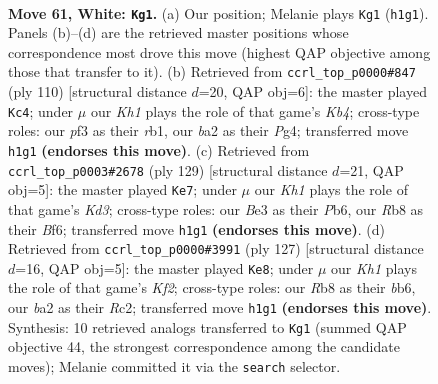\documentclass[11pt]{article}
\begin{document}
\clearpage

\begin{figure}[p]\centering
\begin{subfigure}{0.46\textwidth}\centering
\resizebox{\linewidth}{!}{%
\newchessgame
\chessboard[
  setfen={1R6/6k1/4r3/8/B3p2p/4Bp1P/b4P2/7K w - - 32 61},
  showmover=false,
  pgfstyle=straightmove, color=movearrow, markmove={h1-g1}
]}
\caption{}
\end{subfigure}\hfill
\begin{subfigure}{0.46\textwidth}\centering
\resizebox{\linewidth}{!}{%
\newchessgame
\chessboard[
  setfen={5k2/R2B1p2/3p4/4b1pP/1K2P1P1/8/8/1r6 w - - 27 56},
  showmover=false,
  pgfstyle=straightmove, color=movearrow, markmove={b4-c4}
]}
\caption{}
\end{subfigure}
\\[4pt]
\begin{subfigure}{0.46\textwidth}\centering
\resizebox{\linewidth}{!}{%
\newchessgame
\chessboard[
  setfen={8/p7/1p1k1b2/1P3P2/P4K1p/1B5P/8/8 b - - 5 65},
  showmover=false,
  pgfstyle=straightmove, color=movearrow, markmove={d6-e7}
]}
\caption{}
\end{subfigure}\hfill
\begin{subfigure}{0.46\textwidth}\centering
\resizebox{\linewidth}{!}{%
\newchessgame
\chessboard[
  setfen={8/3R1k2/1B6/4Pp2/5Pp1/5bP1/2r5/4K3 b - - 13 64},
  showmover=false,
  pgfstyle=straightmove, color=movearrow, markmove={f7-e8}
]}
\caption{}
\end{subfigure}
\caption{\textbf{Move 61, White: \texttt{Kg1}.} (a) Our position; Melanie plays \texttt{Kg1} (\texttt{h1g1}). Panels (b)--(d) are the retrieved master positions whose correspondence most drove this move (highest QAP objective among those that transfer to it). (b) Retrieved from \texttt{ccrl\_top\_p0000\#847} (ply 110) [structural distance $d$=20, QAP obj=6]: the master played \texttt{Kc4}; under $\mu$ our \emph{Kh1} plays the role of that game's \emph{Kb4}; cross-type roles: our \emph{p}f3 as their \emph{r}b1, our \emph{b}a2 as their \emph{P}g4; transferred move \texttt{h1g1} \textbf{(endorses this move)}. (c) Retrieved from \texttt{ccrl\_top\_p0003\#2678} (ply 129) [structural distance $d$=21, QAP obj=5]: the master played \texttt{Ke7}; under $\mu$ our \emph{Kh1} plays the role of that game's \emph{Kd3}; cross-type roles: our \emph{B}e3 as their \emph{P}b6, our \emph{R}b8 as their \emph{B}f6; transferred move \texttt{h1g1} \textbf{(endorses this move)}. (d) Retrieved from \texttt{ccrl\_top\_p0000\#3991} (ply 127) [structural distance $d$=16, QAP obj=5]: the master played \texttt{Ke8}; under $\mu$ our \emph{Kh1} plays the role of that game's \emph{Kf2}; cross-type roles: our \emph{R}b8 as their \emph{b}b6, our \emph{b}a2 as their \emph{R}c2; transferred move \texttt{h1g1} \textbf{(endorses this move)}. Synthesis: 10 retrieved analogs transferred to \texttt{Kg1} (summed QAP objective 44, the strongest correspondence among the candidate moves); Melanie committed it via the \texttt{search} selector.}
\label{fig:thought-m120}
\end{figure}
\end{document}
